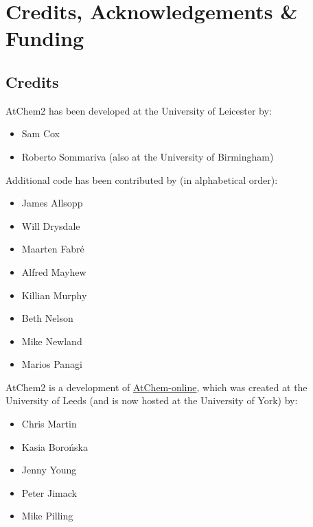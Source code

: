 %
%
%
%

\chapter{Credits, Acknowledgements \& Funding} \label{ch:credits}

\setlength{\parindent}{0pt}

\section{Credits} \label{sec:credits}

AtChem2 has been developed at the University of Leicester by:

\begin{itemize}
\item Sam Cox
\item Roberto Sommariva (also at the University of Birmingham)
\end{itemize}

Additional code has been contributed by (in alphabetical order):

\begin{itemize}
\item James Allsopp
\item Will Drysdale
\item Maarten Fabr{\'e}
\item Alfred Mayhew
\item Killian Murphy
\item Beth Nelson
\item Mike Newland
\item Marios Panagi
\end{itemize}

AtChem2 is a development of \href{https://atchem.york.ac.uk/}{AtChem-online},
which was created at the University of Leeds (and is now hosted at the
University of York) by:

\begin{itemize}
\item Chris Martin
\item Kasia Boro{\'n}ska
\item Jenny Young
\item Peter Jimack
\item Mike Pilling
\end{itemize}

